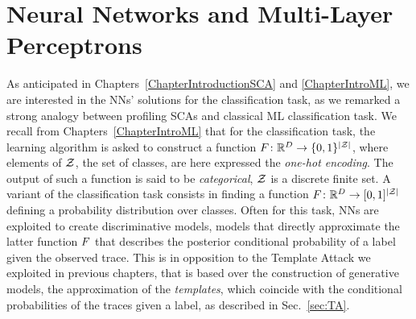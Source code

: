 

\section{Neural Networks and Multi-Layer Perceptrons}
As anticipated in Chapters~\ref{ChapterIntroductionSCA} and \ref{ChapterIntroML}, we are interested in the NNs' solutions for the classification task, as we remarked a strong analogy between profiling SCAs and classical ML classification task. We recall from Chapters~\ref{ChapterIntroML} that for the classification task, the learning algorithm is asked to construct a function $F\colon \mathbb{R}^D \rightarrow \{0,1\}^{\lvert\mathcal{Z}\rvert}$, where elements of $\mathcal{Z}$, \ie the set of classes, are here expressed \via the \emph{one-hot encoding}. The output of such a function is said to be \emph{categorical}, \ie $\mathcal{Z}$ is a discrete finite set. A variant of the classification task consists in finding a function $F\colon \mathbb{R}^D \rightarrow [0,1]^{\lvert\mathcal{Z}\rvert}$ defining a probability distribution over classes. Often for this task, NNs are exploited to create discriminative models, \ie models that directly approximate the latter function $F$ that describes the posterior conditional probability of a label given the observed trace. This is in opposition to the Template Attack we exploited in previous chapters, that is based over the construction of generative models, \ie the approximation of the \emph{templates}, which coincide with the conditional probabilities of the traces given a label, as described in Sec.~\ref{sec:TA}. \\

